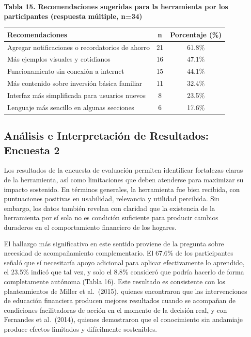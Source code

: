 \documentclass[12pt,letterpaper]{article}
\begin{document}
\textbf{Tabla 15. Recomendaciones sugeridas para la herramienta por los participantes (respuesta múltiple, n=34)}

\begin{longtable}[]{@{}lcc@{}}
\toprule\noalign{}
Recomendaciones & n & Porcentaje (\%) \\
\midrule\noalign{}
\endhead
\bottomrule\noalign{}
\endlastfoot
Agregar notificaciones o recordatorios de ahorro & 21 & 61.8\% \\
Más ejemplos visuales y cotidianos & 16 & 47.1\% \\
Funcionamiento sin conexión a internet & 15 & 44.1\% \\
Más contenido sobre inversión básica familiar & 11 & 32.4\% \\
Interfaz más simplificada para usuarios nuevos & 8 & 23.5\% \\
Lenguaje más sencillo en algunas secciones & 6 & 17.6\% \\
\end{longtable}

\subsection{\texorpdfstring{\textbf{Análisis e Interpretación de Resultados: Encuesta 2}}{Análisis e Interpretación de Resultados: Encuesta 2}}\label{anuxe1lisis-e-interpretaciuxf3n-de-resultados-encuesta-2}

Los resultados de la encuesta de evaluación permiten identificar fortalezas claras de la herramienta, así como limitaciones que deben atenderse para maximizar su impacto sostenido. En términos generales, la herramienta fue bien recibida, con puntuaciones positivas en usabilidad, relevancia y utilidad percibida. Sin embargo, los datos también revelan con claridad que la existencia de la herramienta por sí sola no es condición suficiente para producir cambios duraderos en el comportamiento financiero de los hogares.

El hallazgo más significativo en este sentido proviene de la pregunta sobre necesidad de acompañamiento complementario. El 67.6\% de los participantes señaló que sí necesitaría apoyo adicional para aplicar efectivamente lo aprendido, el 23.5\% indicó que tal vez, y solo el 8.8\% consideró que podría hacerlo de forma completamente autónoma (Tabla 16). Este resultado es consistente con los planteamientos de Miller et al.~(2015), quienes encontraron que las intervenciones de educación financiera producen mejores resultados cuando se acompañan de condiciones facilitadoras de acción en el momento de la decisión real, y con Fernandes et al.~(2014), quienes demostraron que el conocimiento sin andamiaje produce efectos limitados y difícilmente sostenibles.
\end{document}
